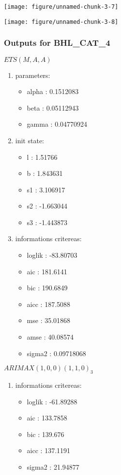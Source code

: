 \documentclass[10pt,a4paper]{article}\usepackage[]{graphicx}\usepackage[]{color}
\makeatletter
\def\maxwidth{ %
  \ifdim\Gin@nat@width>\linewidth
    \linewidth
  \else
    \Gin@nat@width
  \fi
}
\newcommand{\AaA}{\_}
\makeatother
\begin{document}
\texttt{[image: figure/unnamed-chunk-3-7]} 

\newpage

\texttt{[image: figure/unnamed-chunk-3-8]} 

\newpage
\subsubsection{Outputs for BHL\AaA CAT\AaA 4}
\begin{multicols}{2}


$ ETS(M,A,A) $
\begin{enumerate}
\item parameters:
\begin{itemize}
\item  alpha :  0.1512083 
\item  beta :  0.05112943 
\item  gamma :  0.04770924 
\end{itemize}
\item init state:
\begin{itemize}
\item  l :  1.51766 
\item  b :  1.843631 
\item  s1 :  3.106917 
\item  s2 :  -1.663044 
\item  s3 :  -1.443873 
\end{itemize}
\item informations critereas:
\begin{itemize}
\item  loglik :  -83.80703 
\item  aic :  181.6141 
\item  bic :  190.6849 
\item  aicc :  187.5088 
\item  mse :  35.01868 
\item  amse :  40.08574 
\item  sigma2 :  0.09718068 
\end{itemize}
\end{enumerate}

\columnbreak


 $ARIMAX(1,0,0)(1,1,0)_{3}$ 
\begin{enumerate}
\item informations critereas:
\begin{itemize}
\item  loglik :  -61.89288 
\item  aic :  133.7858 
\item  bic :  139.676 
\item  aicc :  137.1191 
\item  sigma2 :  21.94877 
\end{itemize}


\end{enumerate}
\end{multicols}
\end{document}
